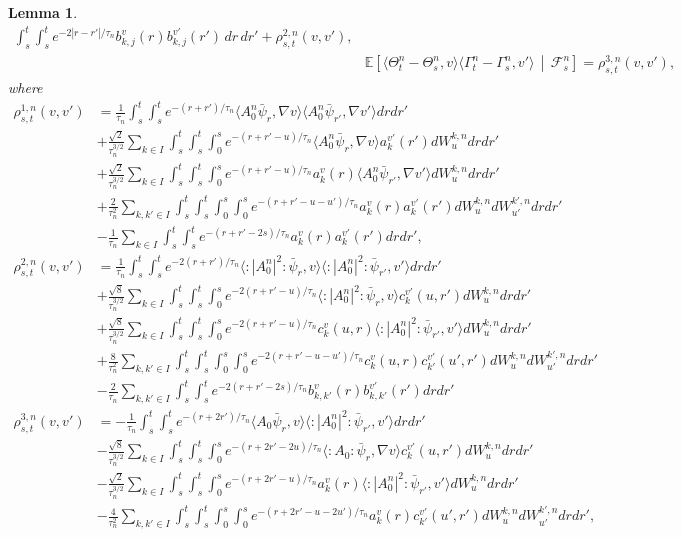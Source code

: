 \documentclass[a4paper,10pt]{amsart}
\newcommand{\wick}[1]{:\mathrel{#1}:}
\newtheorem{lemma}[theorem]{Lemma}
\theoremstyle{remark}
\numberwithin{equation}{section}
\begin{document}
\begin{lemma}
\begin{align}
  \int_s^t\!\!\int_s^t e^{-2|r-r'|/\tau_n}
  b_{k,j}^v(r)b_{k,j}^{v'}(r')\,dr\,dr'
  +\rho_{s,t}^{2,n}(v,v'),\label{second_moment_2}\\
 &\mathbb E\!\left[
  \langle\Theta_t^n-\Theta_s^n,v\rangle
  \langle\Gamma_t^n-\Gamma_s^n,v'\rangle
  \,\middle|\,\mathcal F_s^n\right]
  =\rho_{s,t}^{3,n}(v,v'),\label{second_moment_3}
\end{align}
where
\begin{align*}
    \rho^{1,n}_{s,t}(v,v')&=\frac{1}{\tau_n}\int_s^t\int_s^t e^{-(r+r')/\tau_n} \langle A^n_0 \bar{\psi}_r,\nabla v\rangle \langle A^n_0 \bar{\psi}_{r'},\nabla v'\rangle dr dr'\\ & +\frac{\sqrt{2}}{\tau_n^{3/2}}\sum_{k\in I}\int_s^t\int_s^t\int_0^{s} e^{-(r+r'-u)/\tau_n}\langle A^n_0 \bar{\psi}_r,\nabla v\rangle a_k^{v'}(r') dW^{k,n}_u dr dr'\\ & +\frac{\sqrt{2}}{\tau_n^{3/2}}\sum_{k\in I}\int_s^t\int_s^t\int_0^{s} e^{-(r+r'-u)/\tau_n} a_k^v(r) \langle A^n_0 \bar{\psi}_{r'},\nabla v'\rangle  dW^{k,n}_u dr dr'\\ &+\frac{2}{\tau_n^2}\sum_{k,k'\in I}\int_s^t\int_s^t\int_0^s \int_0^s e^{-(r+r'-u-u')/\tau_n}a_k^v(r)  a_k^{v'}(r') dW^{k,n}_u dW^{k',n}_{u'}dr dr'\\ & -\frac{1}{\tau_n}\sum_{k\in I}\int_s^t \int_s^t  e^{-(r+r'-2s)/\tau_n} a_k^v(r)a_k^{v'}(r') dr dr',
    \\ \rho^{2,n}_{s,t}(v,v')&=\frac{1}{\tau_n}\int_s^t\int_s^t e^{-2(r+r')/\tau_n} \langle \wick{|A^n_0|^2} \bar{\psi}_r, v\rangle \langle \wick{|A^n_0|^2} \bar{\psi}_{r'}, v'\rangle dr dr'\\ & +\frac{\sqrt{8}}{\tau_n^{3/2}}\sum_{k\in I}\int_s^t\int_s^t\int_0^{s} e^{-2(r+r'-u)/\tau_n}\langle \wick{|A^n_0|^2} \bar{\psi}_r, v\rangle c_k^{v'}(u,r') dW^{k,n}_u dr dr'\\ & +\frac{\sqrt{8}}{\tau_n^{3/2}}\sum_{k\in I}\int_s^t\int_s^t\int_0^{s} e^{-2(r+r'-u)/\tau_n} c_k^{v}(u,r) \langle \wick{|A^n_0|^2} \bar{\psi}_{r'}, v'\rangle  dW^{k,n}_u dr dr'\\ &+\frac{8}{\tau_n^2}\sum_{k,k'\in I}\int_s^t\int_s^t\int_0^s \int_0^s e^{-2(r+r'-u-u')/\tau_n} c_k^v(u,r) c_{k'}^{v'}(u',r') dW^{k,n}_u dW^{k',n}_{u'}dr dr'\\ & -\frac{2}{\tau_n}\sum_{k,k'\in I}\int_s^t \int_s^t  e^{-2(r+r'-2s)/\tau_n} b_{k,k'}^v(r) b_{k,k'}^{v'}(r') dr dr'   \\
    \rho^{3,n}_{s,t}(v,v')&=-\frac{1}{\tau_n}\int_s^t\int_s^t e^{-(r+2r')/\tau_n} \langle A_0 \bar{\psi}_r, v\rangle \langle \wick{|A^n_0|^2} \bar{\psi}_{r'}, v'\rangle dr dr'\\ & -\frac{\sqrt{8}}{\tau_n^{3/2}}\sum_{k\in I}\int_s^t\int_s^t\int_0^{s} e^{-(r+2r'-2u)/\tau_n}\langle \wick{A_0} \bar{\psi}_r, \nabla v\rangle c_k^{v'}(u,r') dW^{k,n}_u dr dr'\\ & -\frac{\sqrt{2}}{\tau_n^{3/2}}\sum_{k\in I}\int_s^t\int_s^t\int_0^{s} e^{-(r+2r'-u)/\tau_n} a_{k}^v(r) \langle \wick{|A^n_0|^2} \bar{\psi}_{r'}, v'\rangle  dW^{k,n}_u dr dr'\\ &-\frac{4}{\tau_n^2}\sum_{k,k'\in I}\int_s^t\int_s^t\int_0^s \int_0^s e^{-(r+2r'-u-2u')/\tau_n} a_k^v(r) c_{k'}^{v'}(u',r') dW^{k,n}_u dW^{k',n}_{u'}dr dr',

\end{align*}
\end{lemma}
\end{document}
